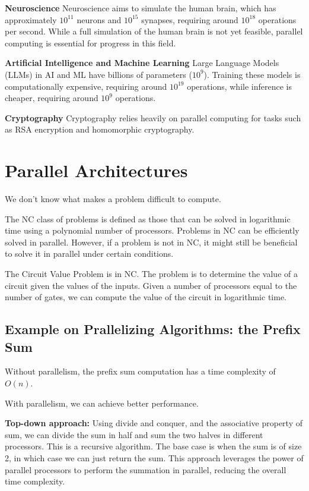 \documentclass[a4paper]{tufte-handout} %
\begin{document}
\textbf{Neuroscience}
Neuroscience aims to simulate the human brain, which has approximately $10^{11}$ neurons and $10^{15}$ synapses, requiring around $10^{18}$ operations per second. While a full simulation of the human brain is not yet feasible, parallel computing is essential for progress in this field.

\textbf{Artificial Intelligence and Machine Learning}
Large Language Models (LLMs) in AI and ML have billions of parameters ($10^9$). Training these models is computationally expensive, requiring around $10^{19}$ operations, while inference is cheaper, requiring around $10^9$ operations.

\textbf{Cryptography}
Cryptography relies heavily on parallel computing for tasks such as RSA encryption\cite{rsa} and homomorphic cryptography\cite{homomorphic_cryptography}.

\section{Parallel Architectures}

We don't know what makes a problem difficult to compute.

The NC class of problems is defined as those that can be solved in logarithmic time using a polynomial number of processors. Problems in NC can be efficiently solved in parallel. However, if a problem is not in NC, it might still be beneficial to solve it in parallel under certain conditions.

The Circuit Value Problem is in NC. The problem is to determine the value of a circuit given the values of the inputs. Given a number of processors equal to the number of gates, we can compute the value of the circuit in logarithmic time.

\subsection{Example on Prallelizing Algorithms: the Prefix Sum}

Without parallelism, the prefix sum computation has a time complexity of $O(n)$. 

With parallelism, we can achieve better performance.

\textbf{Top-down approach:} Using divide and conquer, and the associative property of sum, we can divide the sum in half and sum the two halves in different processors. This is a recursive algorithm. The base case is when the sum is of size 2, in which case we can just return the sum. This approach leverages the power of parallel processors to perform the summation in parallel, reducing the overall time complexity.
\end{document}
